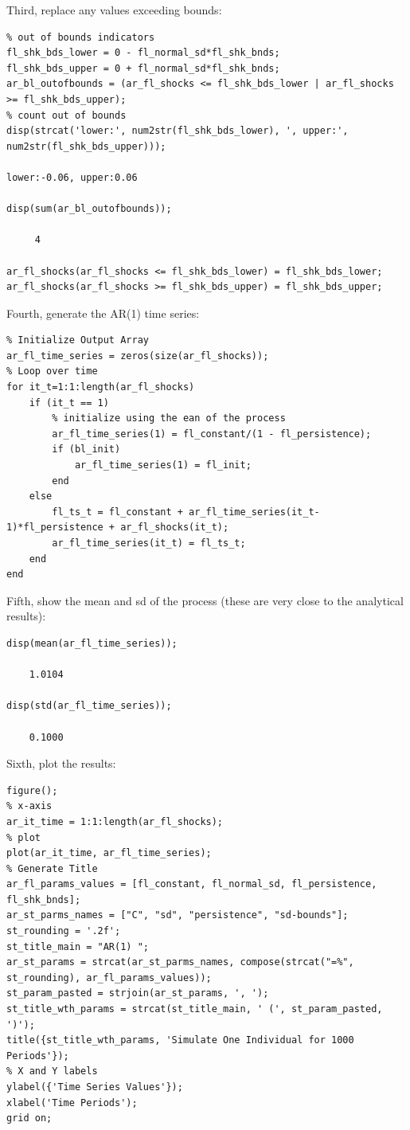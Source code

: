 \documentclass[
]{book}
\begin{document}
Third, replace any values exceeding bounds:

\begin{verbatim}
% out of bounds indicators
fl_shk_bds_lower = 0 - fl_normal_sd*fl_shk_bnds;
fl_shk_bds_upper = 0 + fl_normal_sd*fl_shk_bnds;
ar_bl_outofbounds = (ar_fl_shocks <= fl_shk_bds_lower | ar_fl_shocks >= fl_shk_bds_upper);
% count out of bounds
disp(strcat('lower:', num2str(fl_shk_bds_lower), ', upper:', num2str(fl_shk_bds_upper)));

lower:-0.06, upper:0.06

disp(sum(ar_bl_outofbounds));

     4

ar_fl_shocks(ar_fl_shocks <= fl_shk_bds_lower) = fl_shk_bds_lower;
ar_fl_shocks(ar_fl_shocks >= fl_shk_bds_upper) = fl_shk_bds_upper;
\end{verbatim}

Fourth, generate the AR(1) time series:

\begin{verbatim}
% Initialize Output Array
ar_fl_time_series = zeros(size(ar_fl_shocks));
% Loop over time
for it_t=1:1:length(ar_fl_shocks)
    if (it_t == 1)
        % initialize using the ean of the process
        ar_fl_time_series(1) = fl_constant/(1 - fl_persistence);
        if (bl_init)
            ar_fl_time_series(1) = fl_init;            
        end
    else
        fl_ts_t = fl_constant + ar_fl_time_series(it_t-1)*fl_persistence + ar_fl_shocks(it_t);
        ar_fl_time_series(it_t) = fl_ts_t;
    end
end
\end{verbatim}

Fifth, show the mean and sd of the process (these are very close to the
analytical results):

\begin{verbatim}
disp(mean(ar_fl_time_series));

    1.0104

disp(std(ar_fl_time_series));

    0.1000
\end{verbatim}

Sixth, plot the results:

\begin{verbatim}
figure();
% x-axis
ar_it_time = 1:1:length(ar_fl_shocks);
% plot
plot(ar_it_time, ar_fl_time_series);
% Generate Title
ar_fl_params_values = [fl_constant, fl_normal_sd, fl_persistence, fl_shk_bnds];
ar_st_parms_names = ["C", "sd", "persistence", "sd-bounds"];
st_rounding = '.2f';
st_title_main = "AR(1) ";
ar_st_params = strcat(ar_st_parms_names, compose(strcat("=%", st_rounding), ar_fl_params_values));
st_param_pasted = strjoin(ar_st_params, ', ');
st_title_wth_params = strcat(st_title_main, ' (', st_param_pasted, ')');
title({st_title_wth_params, 'Simulate One Individual for 1000 Periods'});
% X and Y labels
ylabel({'Time Series Values'});
xlabel('Time Periods');
grid on;
\end{verbatim}
\end{document}
